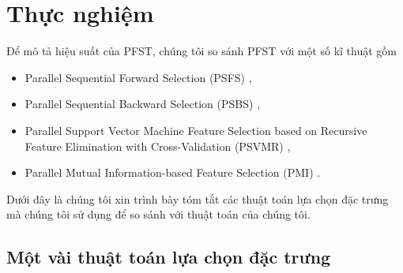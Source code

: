 \chapter{Thực nghiệm}\label{exper}
Để mô tả hiệu suất của PFST, chúng tôi so sánh PFST với một số kĩ thuật gồm
\begin{itemize}
	\item Parallel Sequential Forward Selection (PSFS) \cite{scikit-learn},
	\item Parallel Sequential Backward Selection (PSBS) \cite{scikit-learn},
	\item Parallel Support Vector Machine Feature Selection based on Recursive Feature Elimination with Cross-Validation (PSVMR) \cite{guyon2002gene},
	\item Parallel Mutual Information-based Feature Selection (PMI) \cite{bennasar2015feature}.
\end{itemize}
Dưới đây là chúng tôi xin trình bày tóm tắt các thuật toán lựa chọn đặc trưng mà chúng tôi sử dụng để so sánh với thuật toán của chúng tôi.
\section{Một vài thuật toán lựa chọn đặc trưng }
